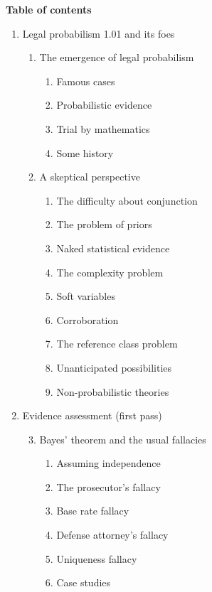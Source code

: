 \documentclass[
  10pt,
  dvipsnames,enabledeprecatedfontcommands]{scrartcl}
\begin{document}
\newpage

\vspace{-4mm}

\begin{center}\textbf{\large Table of contents}\end{center}
\begin{multicols}{2}
\footnotesize

\renewcommand{\labelenumi}{\Roman{enumi}}
\renewcommand{\labelenumii}{\arabic{enumii}}
\renewcommand{\labelenumiii}{\arabic{enumii}.\arabic{enumiii}}

\begin{enumerate}
\item Legal probabilism 1.01 and its foes
\begin{enumerate}

  \item The emergence of legal probabilism
  \begin{enumerate}
  \item  Famous cases
  \item  Probabilistic evidence
  \item  Trial by mathematics
  \item  Some history
  \end{enumerate}
  

  
  \item  A skeptical perspective
  \begin{enumerate}
  \item  The difficulty about conjunction
  \item  The problem of priors
  \item  Naked statistical evidence
  \item  The complexity problem
  \item  Soft variables
  \item  Corroboration
  \item  The reference class problem
  \item  Unanticipated possibilities
  \item  Non-probabilistic theories
  \end{enumerate}


\end{enumerate}
\item  Evidence assessment (first pass)


\begin{enumerate}


\setcounter{enumii}{2}
  \item  Bayes' theorem and the usual fallacies
  \begin{enumerate}
  \item  Assuming independence
  \item  The prosecutor's fallacy
  \item  Base rate fallacy
  \item  Defense attorney's fallacy
  \item  Uniqueness fallacy
  \item  Case studies
  \end{enumerate}


\end{enumerate}
\end{enumerate}
\end{multicols}
\end{document}
